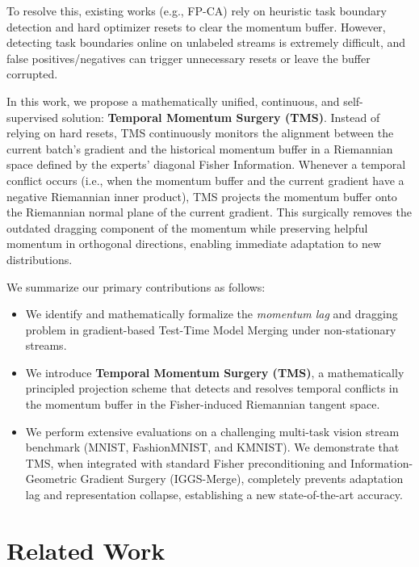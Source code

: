 \documentclass{article}
\theoremstyle{plain}
\theoremstyle{definition}
\theoremstyle{remark}
\begin{document}
To resolve this, existing works (e.g., FP-CA) rely on heuristic task boundary detection and hard optimizer resets to clear the momentum buffer. However, detecting task boundaries online on unlabeled streams is extremely difficult, and false positives/negatives can trigger unnecessary resets or leave the buffer corrupted.

In this work, we propose a mathematically unified, continuous, and self-supervised solution: \textbf{Temporal Momentum Surgery (TMS)}. Instead of relying on hard resets, TMS continuously monitors the alignment between the current batch's gradient and the historical momentum buffer in a Riemannian space defined by the experts' diagonal Fisher Information. Whenever a temporal conflict occurs (i.e., when the momentum buffer and the current gradient have a negative Riemannian inner product), TMS projects the momentum buffer onto the Riemannian normal plane of the current gradient. This surgically removes the outdated dragging component of the momentum while preserving helpful momentum in orthogonal directions, enabling immediate adaptation to new distributions.

We summarize our primary contributions as follows:
\begin{itemize}
    \item We identify and mathematically formalize the \emph{momentum lag} and dragging problem in gradient-based Test-Time Model Merging under non-stationary streams.
    \item We introduce \textbf{Temporal Momentum Surgery (TMS)}, a mathematically principled projection scheme that detects and resolves temporal conflicts in the momentum buffer in the Fisher-induced Riemannian tangent space.
    \item We perform extensive evaluations on a challenging multi-task vision stream benchmark (MNIST, FashionMNIST, and KMNIST). We demonstrate that TMS, when integrated with standard Fisher preconditioning and Information-Geometric Gradient Surgery (IGGS-Merge), completely prevents adaptation lag and representation collapse, establishing a new state-of-the-art accuracy.
\end{itemize}

\section{Related Work}
\label{sec:related}
\end{document}
